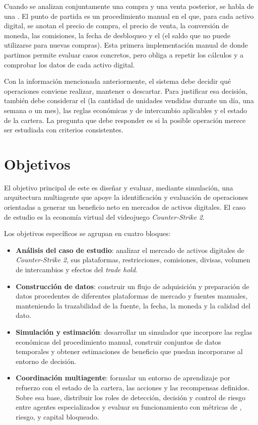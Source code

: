 Cuando se analizan conjuntamente una compra y una venta posterior, se habla de una \textbf{}. El punto de partida es un procedimiento manual en el que, para cada activo digital, se anotan el precio de compra, el precio de venta, la conversión de moneda, las comisiones, la fecha de desbloqueo y el \textbf{} (el saldo que no puede utilizarse para nuevas compras). Esta primera implementación manual de donde partimos permite evaluar casos concretos, pero obliga a repetir los cálculos y a comprobar los datos de cada activo digital.

Con la información mencionada anteriormente, el sistema debe decidir qué operaciones conviene realizar, mantener o descartar. Para justificar esa decisión, también debe considerar el \textbf{} (la cantidad de unidades vendidas durante un día, una semana o un mes), las reglas económicas y de intercambio aplicables y el estado de la cartera. La pregunta que debe responder es si la posible operación merece ser estudiada con criterios consistentes.

\section{Objetivos}

El objetivo principal de este  es diseñar y evaluar, mediante simulación, una arquitectura multiagente que apoye la identificación y evaluación de operaciones orientadas a generar un beneficio neto en mercados de activos digitales. El caso de estudio es la economía virtual del videojuego \textit{Counter-Strike 2}.

Los objetivos específicos se agrupan en cuatro bloques:

\begin{itemize}
  \item \textbf{Análisis del caso de estudio}: analizar el mercado de activos digitales de \textit{Counter-Strike 2}, sus plataformas, restricciones, comisiones, divisas, volumen de intercambios y efectos del \textit{trade hold}.
  \item \textbf{Construcción de datos}: construir un flujo de adquisición y preparación de datos procedentes de diferentes plataformas de mercado y fuentes manuales, manteniendo la trazabilidad de la fuente, la fecha, la moneda y la calidad del dato.
  \item \textbf{Simulación y estimación}: desarrollar un simulador que incorpore las reglas económicas del procedimiento manual, construir conjuntos de datos temporales y obtener estimaciones de beneficio que puedan incorporarse al entorno de decisión.
  \item \textbf{Coordinación multiagente}: formular un entorno de aprendizaje por refuerzo con el estado de la cartera, las acciones y las recompensas definidos. Sobre esa base, distribuir los roles de detección, decisión y control de riesgo entre agentes especializados y evaluar su funcionamiento con métricas de \textbf{}, riesgo, \textbf{} y capital bloqueado.
\end{itemize}

